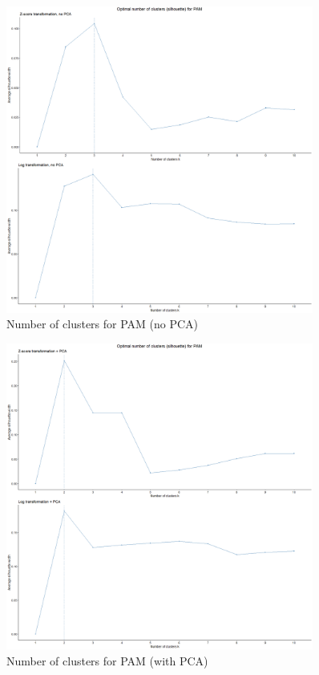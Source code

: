 \documentclass{article}
\begin{document}
	\begin{figure}[h]
		\centering
		\includegraphics[width=0.9\textwidth]{proj2_plots/pam_clust_num.png}
		\caption{Number of clusters for PAM (no PCA)}
		\label{fig::clust_num_pam}
	\end{figure}
	
	\begin{figure}[h]
		\centering
		\includegraphics[width=0.9\textwidth]{proj2_plots/pam_clust_num_pca.png}
		\caption{Number of clusters for PAM (with PCA)}
		\label{fig::clust_num_pam_pca}
	\end{figure}
\end{document}
